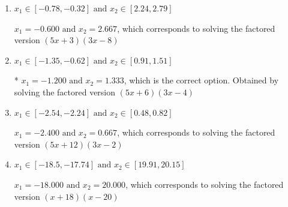 \documentclass{extbook}[14pt]
\begin{document}
\begin{enumerate}
{\begin{enumerate}[label=\Alph*.]
$x_1 = -6.000 \text{ and } x_2 = 0.267$, which corresponds to solving the factored version $(x + 6)(15x -4)$
\item \( x_1 \in [-0.78, -0.32] \text{ and } x_2 \in [2.24, 2.79] \)

$x_1 = -0.600 \text{ and } x_2 = 2.667$, which corresponds to solving the factored version $(5x + 3)(3x -8)$
\item \( x_1 \in [-1.35, -0.62] \text{ and } x_2 \in [0.91, 1.51] \)

* $x_1 = -1.200 \text{ and } x_2 = 1.333$, which is the correct option. Obtained by solving the factored version $(5x + 6)(3x -4)$
\item \( x_1 \in [-2.54, -2.24] \text{ and } x_2 \in [0.48, 0.82] \)

$x_1 = -2.400 \text{ and } x_2 = 0.667$, which corresponds to solving the factored version $(5x + 12)(3x -2)$
\item \( x_1 \in [-18.5, -17.74] \text{ and } x_2 \in [19.91, 20.15] \)

$x_1 = -18.000 \text{ and } x_2 = 20.000$, which corresponds to solving the factored version $(x + 18)(x -20)$
\end{enumerate}

}
\end{enumerate}
\end{document}
